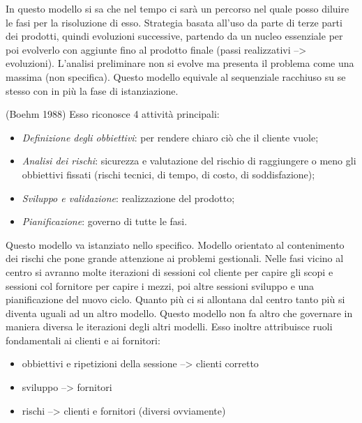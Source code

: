 In questo modello si sa che nel tempo ci sarà un percorso nel quale posso diluire le fasi per la risoluzione di esso. Strategia basata all'uso da parte di terze parti dei prodotti, quindi evoluzioni successive, partendo da un nucleo essenziale per poi evolverlo con aggiunte fino al prodotto finale (passi realizzativi --> evoluzioni). L'analisi preliminare non si evolve ma presenta il problema come una massima (non specifica).
Questo modello equivale al sequenziale racchiuso su se stesso con in più la fase di istanziazione.

(Boehm 1988) Esso riconosce 4 attività principali:
\begin{itemize}
\item \textit{Definizione degli obbiettivi}: per rendere chiaro ciò che il cliente vuole;
\item \textit{Analisi dei rischi}: sicurezza e valutazione del rischio di raggiungere o meno gli obbiettivi fissati (rischi tecnici, di tempo, di costo, di soddisfazione);
\item \textit{Sviluppo e validazione}: realizzazione del prodotto;
\item \textit{Pianificazione}: governo di tutte le fasi.
\end{itemize}
Questo modello va istanziato nello specifico. Modello orientato al contenimento dei rischi che pone grande attenzione ai problemi gestionali. Nelle fasi vicino al centro si avranno molte iterazioni di sessioni col cliente per capire gli scopi e sessioni col fornitore per capire i mezzi, poi altre sessioni sviluppo e una pianificazione del nuovo ciclo. Quanto più ci si allontana dal centro tanto più si diventa uguali ad un altro modello. Questo modello non fa altro che governare in maniera diversa le iterazioni degli altri modelli. Esso inoltre attribuisce ruoli fondamentali ai clienti e ai fornitori:
\begin{itemize}
\item obbiettivi e ripetizioni della sessione --> clienti corretto 
\item sviluppo --> fornitori
\item rischi --> clienti e fornitori (diversi ovviamente)
\end{itemize}